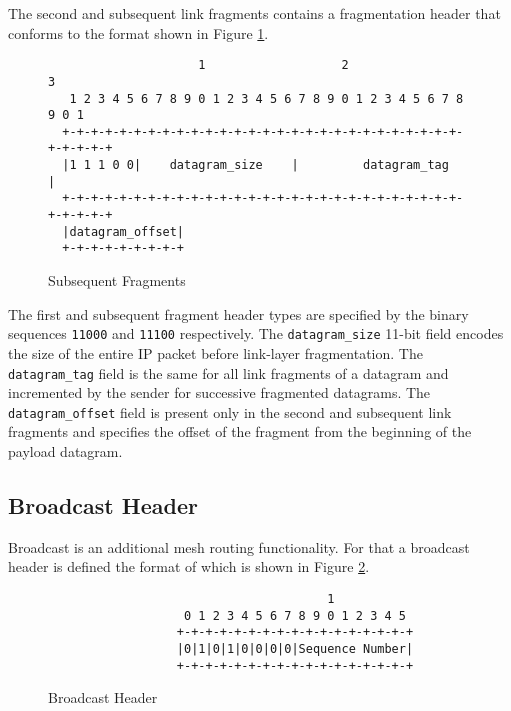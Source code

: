\documentclass[12pt, titlepage, a4paper]{report}
\newenvironment{mylisting}
{\begin{list}{}{\setlength{\leftmargin}{1em}}\item\footnotesize}
{\end{list}}
\begin{document}
The second and subsequent link fragments contains a fragmentation header that conforms to the format shown in Figure \ref{fig:sub.fragment}.

\begin{figure}[htp]
\centering
\begin{mylisting}
\begin{verbatim}
                     1                   2                   3
   1 2 3 4 5 6 7 8 9 0 1 2 3 4 5 6 7 8 9 0 1 2 3 4 5 6 7 8 9 0 1
  +-+-+-+-+-+-+-+-+-+-+-+-+-+-+-+-+-+-+-+-+-+-+-+-+-+-+-+-+-+-+-+-+
  |1 1 1 0 0|    datagram_size    |         datagram_tag          |
  +-+-+-+-+-+-+-+-+-+-+-+-+-+-+-+-+-+-+-+-+-+-+-+-+-+-+-+-+-+-+-+-+
  |datagram_offset|
  +-+-+-+-+-+-+-+-+
\end{verbatim}
\end{mylisting}
\caption{Subsequent Fragments}\label{fig:sub.fragment}
\end{figure}

The first and subsequent fragment header types are specified by the binary sequences \texttt{11000} and \texttt{11100} respectively.  The  \texttt{datagram\_size} 11-bit field encodes the size of the entire IP packet before link-layer fragmentation.  The \texttt{datagram\_tag} field is the same for all link fragments of a datagram and incremented by the sender for successive fragmented datagrams. The \texttt{datagram\_offset} field is present only in the second and subsequent link fragments and specifies the offset of the fragment from the beginning of the payload datagram.

\subsection{Broadcast Header}\label{subsec:broad.header}
Broadcast is an additional mesh routing functionality. For that a broadcast header is defined the format of which is shown in Figure \ref{fig:broad.header}.
\begin{figure}[htp]
\begin{mylisting}
\begin{verbatim}
                                       1
                   0 1 2 3 4 5 6 7 8 9 0 1 2 3 4 5
                  +-+-+-+-+-+-+-+-+-+-+-+-+-+-+-+-+
                  |0|1|0|1|0|0|0|0|Sequence Number|
                  +-+-+-+-+-+-+-+-+-+-+-+-+-+-+-+-+
\end{verbatim}
\end{mylisting}
\caption{Broadcast Header
}\label{fig:broad.header}
\end{figure}
\end{document}
